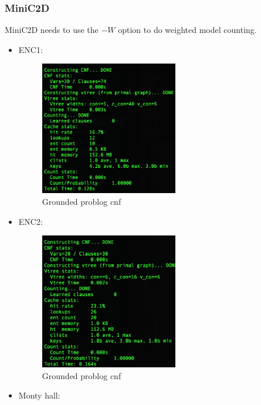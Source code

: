 \subsubsection{MiniC2D}
MiniC2D needs to use the $-W$ option to do weighted model counting.
\begin{itemize}
	\item ENC1:
\begin{figure}[H]
  \includegraphics[width=6cm]{minic2d-ENC1.png}
  \caption{Grounded problog cnf}
\end{figure}
	\item ENC2:
	\begin{figure}[H]
  \includegraphics[width=6cm]{minic2d-ENC2.png}
  \caption{Grounded problog cnf}
\end{figure}
	\item Monty hall:
\end{itemize}

